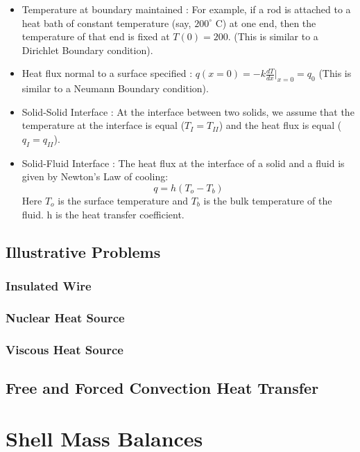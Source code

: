 \begin{itemize}

    \item Temperature at boundary maintained : For example, if a rod is attached to a heat bath of constant temperature (say, $200^{\circ}$ C) at one end, then the temperature of that end is fixed at $T(0) = 200$. (This is similar to a Dirichlet Boundary condition).

    \item Heat flux normal to a surface specified : $q(x=0) = -k \frac{dT}{dx}|_{x=0} = q_{0}$ (This is similar to a Neumann Boundary condition).

    \item Solid-Solid Interface : At the interface between two solids, we assume that the temperature at the interface is equal ($T_{I} = T_{II}$) and the heat flux is equal ($q_{I} = q_{II}$).

    \item Solid-Fluid Interface : The heat flux at the interface of a solid and a fluid is given by Newton's Law of cooling: $$q = h(T_{o} - T_{b})$$ Here $T_{o}$ is the surface temperature and $T_{b}$ is the bulk temperature of the fluid. h is the heat transfer coefficient.

\end{itemize}


\subsection{Illustrative Problems}

\subsubsection{Insulated Wire}

\subsubsection{Nuclear Heat Source}

\subsubsection{Viscous Heat Source}

\subsection{Free and Forced Convection Heat Transfer}


\section{Shell Mass Balances}

